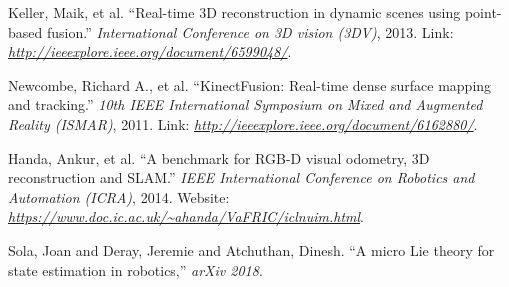 \documentclass[12pt, a4paper]{article}
\begin{document}
\begin{thebibliography}{1}
	 Keller, Maik, et al. ``Real-time 3D reconstruction
	in dynamic scenes using point-based fusion.'' \emph{International
		Conference on 3D vision (3DV)}, 2013. Link: \label{PBF}\emph{\uline{http://ieeexplore.ieee.org/document/6599048/}}.

	 Newcombe, Richard A., et al. ``KinectFusion: Real-time
	dense surface mapping and tracking.'' \emph{10th IEEE International
		Symposium on Mixed and Augmented Reality (ISMAR)}, 2011. Link: \label{KF}\emph{\uline{http://ieeexplore.ieee.org/document/6162880/}}.

	 Handa, Ankur, et al. ``A benchmark for RGB-D
	visual odometry, 3D reconstruction and SLAM.'' \emph{IEEE International
		Conference on Robotics and Automation (ICRA)}, 2014. Website: \label{ICL_NUIM}\emph{\uline{https://www.doc.ic.ac.uk/\textasciitilde{}ahanda/VaFRIC/iclnuim.html}}.

	Sola, Joan and Deray, Jeremie and Atchuthan, Dinesh.
	``A micro Lie theory for state estimation in robotics,'' \emph{arXiv 2018}.
\end{thebibliography}
\end{document}
